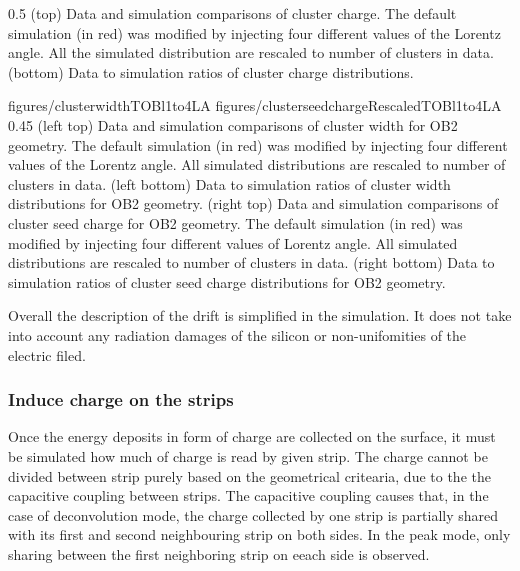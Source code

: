                  {0.5}       %
                 { (top) Data and simulation comparisons of cluster charge. The default simulation (in red) was modified by injecting four different values of the Lorentz angle. All the simulated distribution are rescaled to number of clusters in data. (bottom) Data to simulation ratios of cluster charge distributions. }

                 {figures/clusterwidthTOBl1to4LA}
                 {figures/clusterseedchargeRescaledTOBl1to4LA} %
                 {0.45}       %
                 {(left top) Data and simulation  comparisons of cluster width for OB2 geometry. The default simulation (in red) was modified by injecting four different values of the Lorentz angle. All simulated distributions are rescaled to number of clusters in data. (left bottom) Data to simulation ratios of cluster width distributions for OB2 geometry. (right top) Data and simulation  comparisons of cluster seed charge for OB2 geometry. The default simulation (in red) was modified by injecting four different values of Lorentz angle. All simulated distributions are rescaled to number of clusters in data. (right bottom) Data to simulation ratios of cluster seed charge distributions for OB2 geometry. }

Overall the description of the drift is simplified in the simulation. It does not take into account any radiation damages of the silicon or non-unifomities of the electric filed.

\subsubsection{Induce charge on the strips~\label{sec:induce}}

Once the energy deposits in form of charge are collected on the surface, it must be simulated how much of charge is read by given strip. The charge cannot be divided between strip purely based on the geometrical critearia, due to the the capacitive coupling between strips. The capacitive coupling causes that, in the case of deconvolution mode, the charge collected by one strip is partially shared with its first and second neighbouring strip on both sides. In the peak mode, only sharing between the first neighboring strip on eeach side is observed.   

